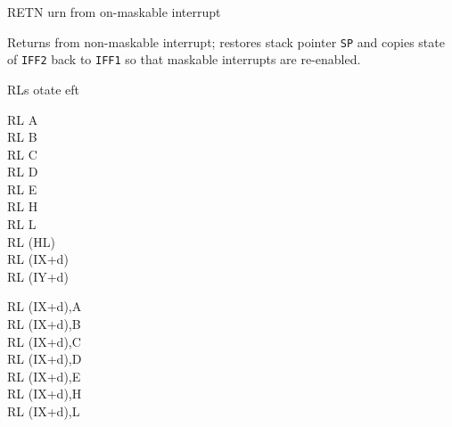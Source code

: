 \begin{basedescript}{
	\desclabelstyle{\multilinelabel}
	\desclabelwidth{3cm}}
	\begin{DetailItem}{RETN}{}
		{urn from on-maskable interrupt}
		{\SymRETN}

		Returns from non-maskable interrupt; restores stack pointer {\tt SP} and copies state of {\tt IFF2} back to {\tt IFF1} so that maskable interrupts are re-enabled.

		\begin{DetailEffects}
			\FlagsRETN
		\end{DetailEffects}
				
		\begin{DetailTiming}
		\end{DetailTiming}

	\end{DetailItem}

	\pagebreak


	\begin{DetailItem}{RL}{s}
		{otate eft}
		{}

		\begin{DetailVariants}
			RL A\\
			RL B\\
			RL C\\
			RL D\\
			RL E\\
			RL H\\
			RL L\\
			RL (HL)\\
			RL (IX+d)\\
			RL (IY+d)

			\columnbreak
			RL (IX+d),A\UNDOC\\
			RL (IX+d),B\UNDOC\\
			RL (IX+d),C\UNDOC\\
			RL (IX+d),D\UNDOC\\
			RL (IX+d),E\UNDOC\\
			RL (IX+d),H\UNDOC\\
			RL (IX+d),L\UNDOC


\end{DetailVariants}
\end{DetailItem}
\end{basedescript}
